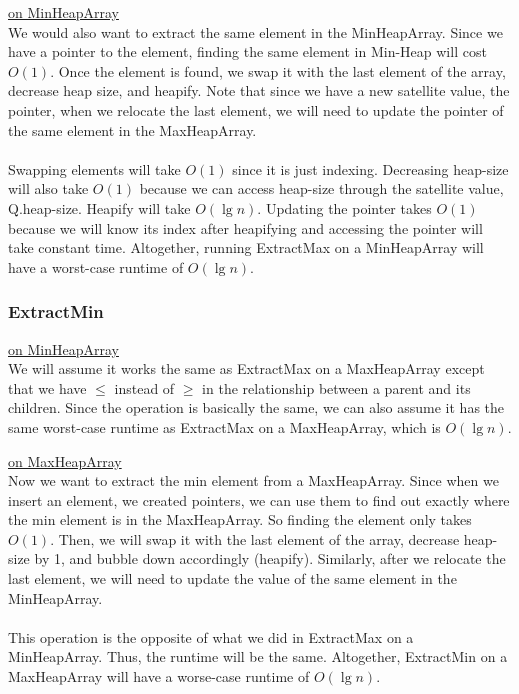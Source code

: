 \documentclass{article}
\begin{document}
\bigskip\noindent
\underline{on MinHeapArray}\\
We would also want to extract the same element in the MinHeapArray. Since we have a pointer to the element, finding the same element in Min-Heap will cost $O(1)$. Once the element is found, we swap it with the last element of the array, decrease heap size, and heapify. Note that since we have a new satellite value, the pointer, when we relocate the last element, we will need to update the pointer of the same element in the MaxHeapArray. \\~\\
Swapping elements will take $O(1)$ since it is just indexing. Decreasing heap-size will also take $O(1)$ because we can access heap-size through the satellite value, Q.heap-size. Heapify will take $O(\lg n)$. Updating the pointer takes $O(1)$ because we will know its index after heapifying and accessing the pointer will take constant time. Altogether, running ExtractMax on a MinHeapArray will have a worst-case runtime of $O(\lg n)$. 

\subsubsection*{ExtractMin}
\underline{on MinHeapArray}\\
\noindent
We will assume it works the same as ExtractMax on a MaxHeapArray except that we have $\leq $ instead of $\geq$ in the relationship between a parent and its children. Since the operation is basically the same, we can also assume it has the same worst-case runtime as ExtractMax on a MaxHeapArray, which is $O(\lg n)$.


\bigskip\noindent
\underline{on MaxHeapArray}\\
Now we want to extract the min element from a MaxHeapArray. Since when we insert an element, we created pointers, we can use them to find out exactly where the min element is in the MaxHeapArray. So finding the element only takes $O(1)$. Then, we will swap it with the last element of the array, decrease heap-size by 1, and bubble down accordingly (heapify). Similarly, after we relocate the last element, we will need to update the value of the same element in the MinHeapArray. \\~\\
This operation is the opposite of what we did in ExtractMax on a MinHeapArray. Thus, the runtime will be the same. Altogether, ExtractMin on a MaxHeapArray will have a worse-case runtime of $O(\lg n)$.  
\newpage
\end{document}
